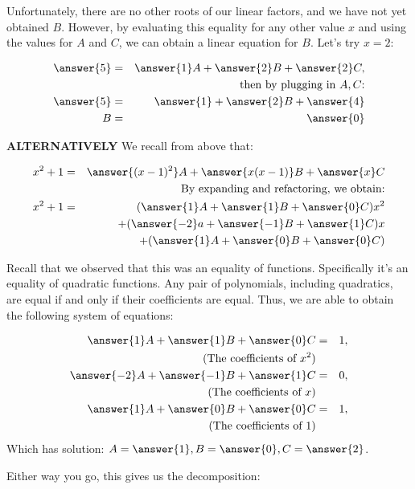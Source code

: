 \documentclass{ximera}
\begin{document}
\begin{explanation}
Unfortunately, there are no other roots of our linear factors, and we have not yet obtained $B$.  However, by evaluating this equality for any other value $x$ and using the values for $A$ and $C$, we can obtain a linear equation for $B$.  Let's try $x=2$:

\begin{eqnarray*}
\answer{5}&=&\answer{1}A+\answer{2}B+\answer{2}C,\\
&& \text{then by plugging in $A, C$:}\\
\answer{5}&=&\answer{1}+\answer{2}B+\answer{4}\\
B&=&\answer{0}
\end{eqnarray*}

\textbf{ALTERNATIVELY} We recall from above that:

\begin{eqnarray*}
x^2+1&=&\answer{(x-1)^2}A+\answer{x(x-1)}B+\answer{x}C\\
&&\text{By expanding and refactoring, we obtain:}\\
x^2+1&=&(\answer{1}A+\answer{1}B+\answer{0}C)x^2\\
&&+(\answer{-2}a+\answer{-1}B+\answer{1}C)x\\
&&+(\answer{1}A+\answer{0}B+\answer{0}C)
\end{eqnarray*}

Recall that we observed that this was an equality of functions.  Specifically it's an equality of quadratic functions.  Any pair of polynomials, including quadratics, are equal if and only if their coefficients are equal.  Thus, we are able to obtain the following system of equations:

\begin{eqnarray*}
\answer{1}A+\answer{1}B+\answer{0}C&=&1,\\ \text{(The coefficients of $x^2$)}&&\\
\answer{-2}A+\answer{-1}B+\answer{1}C&=&0,\\ \text{(The coefficients of $x$)}&&\\
\answer{1}A+\answer{0}B+\answer{0}C&=&1,\\  \text{(The coefficients of $1$)}&&\\
\end{eqnarray*}
Which has solution: $A=\answer{1}, B=\answer{0}, C=\answer{2}$.

Either way you go, this gives us the decomposition:


\end{explanation}
\end{document}
